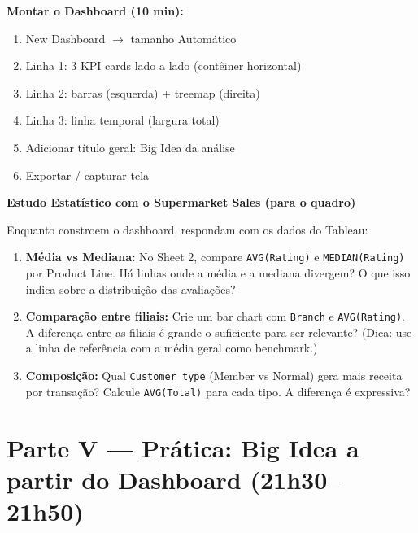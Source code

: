\begin{SolvedBox}
\textbf{Montar o Dashboard (10 min):}
\begin{enumerate}
  \item New Dashboard $\to$ tamanho Automático
  \item Linha 1: 3 KPI cards lado a lado (contêiner horizontal)
  \item Linha 2: barras (esquerda) + treemap (direita)
  \item Linha 3: linha temporal (largura total)
  \item Adicionar título geral: Big Idea da análise
  \item Exportar / capturar tela
\end{enumerate}
\end{SolvedBox}

\begin{BoardBox}
\textbf{Estudo Estatístico com o Supermarket Sales (para o quadro)}

Enquanto constroem o dashboard, respondam com os dados do Tableau:

\begin{enumerate}
  \item \textbf{Média vs Mediana:} No Sheet 2, compare
  \texttt{AVG(Rating)} e \texttt{MEDIAN(Rating)} por Product Line.
  Há linhas onde a média e a mediana divergem? O que isso indica
  sobre a distribuição das avaliações?

  \item \textbf{Comparação entre filiais:} Crie um bar chart com
  \texttt{Branch} e \texttt{AVG(Rating)}. A diferença entre as
  filiais é grande o suficiente para ser relevante? (Dica: use a
  linha de referência com a média geral como benchmark.)

  \item \textbf{Composição:} Qual \texttt{Customer type}
  (Member vs Normal) gera mais receita por transação?
  Calcule \texttt{AVG(Total)} para cada tipo. A diferença é
  expressiva?
\end{enumerate}
\end{BoardBox}

\section{Parte V — Prática: Big Idea a partir do Dashboard (21h30–21h50)}


